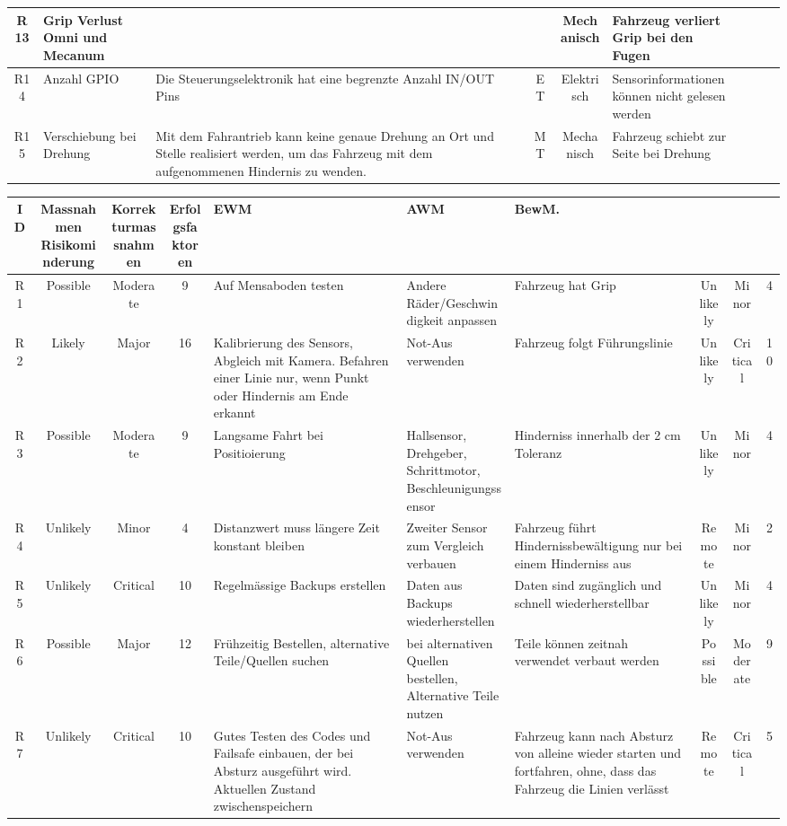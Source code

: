 \begin{landscape}
\begin{longtable}{|c|p{4cm}|p{7cm}|c|c|p{4cm}|c|c|c|}
\hline
R13 & Grip Verlust Omni und Mecanum & & & Mechanisch & Fahrzeug verliert Grip bei den Fugen \\
\hline
R14 & Anzahl GPIO & Die Steuerungselektronik hat eine begrenzte Anzahl IN/OUT Pins & ET & Elektrisch & Sensorinformationen können nicht gelesen werden \\
\hline
R15 & Verschiebung bei Drehung & Mit dem Fahrantrieb kann keine genaue Drehung an Ort und Stelle realisiert werden, um das Fahrzeug mit dem aufgenommenen Hindernis zu wenden. & MT & Mechanisch & Fahrzeug schiebt zur Seite bei Drehung \\
\hline
\end{longtable}

\begin{longtable}{|c|c|c|c|p{6cm}|p{4cm}|p{4cm}|c|c|c|}
\hline
ID & Massnahmen Risikominderung & Korrekturmassnahmen & 
Erfolgsfaktoren & EWM & AWM & BewM.
\\ \hline
R1 & Possible & Moderate & 9 & Auf Mensaboden testen & Andere Räder/Geschwindigkeit anpassen & Fahrzeug hat Grip & Unlikely & Minor & 4 \\ \hline
R2 & Likely & Major & 16 & Kalibrierung des Sensors, Abgleich mit Kamera. Befahren einer Linie nur, wenn Punkt oder Hindernis am Ende erkannt & Not-Aus verwenden & Fahrzeug folgt Führungslinie & Unlikely & Critical & 10 \\ \hline
R3 & Possible & Moderate & 9 & Langsame Fahrt bei Positioierung & Hallsensor, Drehgeber, Schrittmotor, Beschleunigungssensor & Hinderniss innerhalb der 2 cm Toleranz & Unlikely & Minor & 4 \\ \hline
R4 & Unlikely & Minor & 4 & Distanzwert muss längere Zeit konstant bleiben & Zweiter Sensor zum Vergleich verbauen & Fahrzeug führt Hindernissbewältigung nur bei einem Hinderniss aus & Remote & Minor & 2 \\ \hline
R5 & Unlikely & Critical & 10 & Regelmässige Backups erstellen & Daten aus Backups wiederherstellen & Daten sind zugänglich und schnell wiederherstellbar & Unlikely & Minor & 4 \\ \hline
R6 & Possible & Major & 12 & Frühzeitig Bestellen, alternative Teile/Quellen suchen & bei alternativen Quellen bestellen, Alternative Teile nutzen & Teile können zeitnah verwendet verbaut werden & Possible & Moderate & 9 \\ \hline
R7 & Unlikely & Critical & 10 & Gutes Testen des Codes und Failsafe einbauen, der bei Absturz ausgeführt wird. Aktuellen Zustand zwischenspeichern & Not-Aus verwenden & Fahrzeug kann nach Absturz von alleine wieder starten und fortfahren, ohne, dass das Fahrzeug die Linien verlässt & Remote & Critical & 5 \\ \hline

\end{longtable}
\end{landscape}
